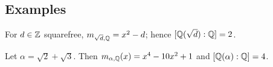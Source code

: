 \subsection{Examples}
\begin{example}
For $d\in\mathbb{Z}$ squarefree, $m_{\sqrt d,\mathbb{Q}}=x^2-d$; hence $[\mathbb{Q}(\sqrt d):\mathbb{Q}]=2$.
\end{example}
\begin{example}
Let $\alpha=\sqrt2+\sqrt3$. Then $m_{\alpha,\mathbb{Q}}(x)=x^4-10x^2+1$ and $[\mathbb{Q}(\alpha):\mathbb{Q}]=4$.
\end{example}
